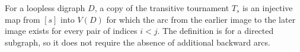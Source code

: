 \begin{definition}
For a loopless digraph $D$, a copy of the transitive tournament $T_s$ is an
injective map from $[s]$ into $V(D)$ for which the arc from the earlier image
to the later image exists for every pair of indices $i<j$.  The definition is
for a directed subgraph, so it does not require the absence of additional
backward arcs.
\end{definition}
